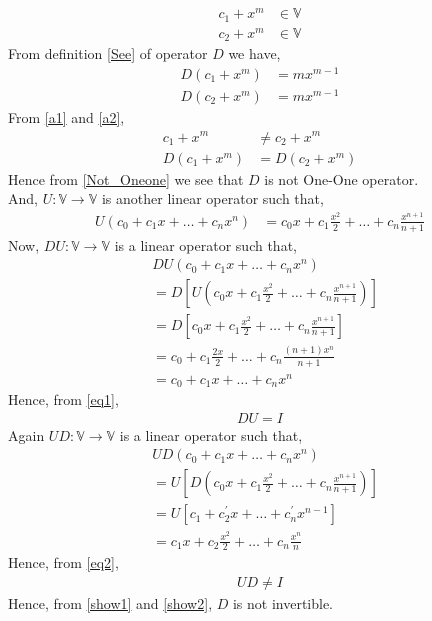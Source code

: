 \documentclass[journal,12pt,twocolumn]{IEEEtran}
\begin{document}
\begin{align}
c_1+x^m &\in \mathbb{V}\\
c_2+x^m &\in \mathbb{V}
\end{align}
From definition \eqref{See} of operator $D$ we have,
\begin{align}
D(c_1+x^m) &= mx^{m-1}\label{a1}\\
D(c_2+x^m) &= mx^{m-1}\label{a2}
\end{align}
From \eqref{a1} and \eqref{a2},
\begin{align}
c_1+x^m &\ne c_2+x^m\\
D(c_1+x^m) &= D(c_2+x^m)\label{Not_Oneone}
\end{align}
Hence from \eqref{Not_Oneone} we see that $D$ is not One-One operator.\\
And, $U:\mathbb{V} \xrightarrow{} \mathbb{V}$ is another linear operator such that,
\begin{align}
U(c_0+c_1x+\dots+c_nx^n) &= c_0x+c_1\frac{x^2}{2}+\dots+c_n\frac{x^{n+1}}{n+1}
\end{align}
Now, $DU:\mathbb{V} \xrightarrow{} \mathbb{V}$ is a linear operator such that,
\begin{align}
&DU(c_0+c_1x+\dots+c_nx^n) \\
&= D[U(c_0x+c_1\frac{x^2}{2}+\dots+c_n\frac{x^{n+1}}{n+1})]\\
&= D[c_0x+c_1\frac{x^2}{2}+\dots+c_n\frac{x^{n+1}}{n+1}]\\
&= c_0+c_1\frac{2x}{2}+\dots+c_n\frac{(n+1)x^{n}}{n+1}\\
&= c_0+c_1x+\dots+c_nx^n\label{eq1}
\end{align}
Hence, from \eqref{eq1},
\begin{align}
DU = I\label{show1}
\end{align}
Again $UD:\mathbb{V} \xrightarrow{} \mathbb{V}$ is a linear operator such that,
\begin{align}
&UD(c_0+c_1x+\dots+c_nx^n) \\
&= U[D(c_0x+c_1\frac{x^2}{2}+\dots+c_n\frac{x^{n+1}}{n+1})]\\
&= U[c_1+c^{\prime}_2x+\dots+c^{\prime}_nx^{n-1}]\\
&= c_1x+c_2\frac{x^2}{2}+\dots+c_n\frac{x^{n}}{n}\label{eq2}\
\end{align}
Hence, from \eqref{eq2},
\begin{align}
UD \ne I\label{show2}
\end{align}
Hence, from \eqref{show1} and \eqref{show2}, $D$ is not invertible.
\end{document}
